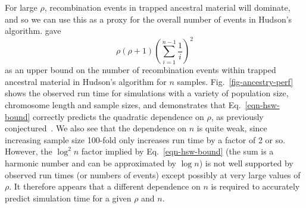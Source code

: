 \documentclass{article}
\begin{document}
For large $\rho$, recombination events in trapped ancestral material will
dominate, and so we can use this as a proxy for the overall number
of events in Hudson's algorithm.
\citet[Eq.~5.10]{hein2004gene} gave
\begin{equation}\label{eqn-hsw-bound}
\rho (\rho + 1) \left( \sum_{i=1}^{n-1} \frac{1}{i} \right)^2
\end{equation}
as an upper bound
on the number of recombination events within trapped ancestral material
in Hudson's algorithm for $n$ samples.
Fig.~\ref{fig-ancestry-perf} shows the observed run time for
simulations with a variety of population size, chromosome
length and sample sizes, and demonstrates that Eq.~\eqref{eqn-hsw-bound}
correctly predicts the quadratic dependence on $\rho$,
as previously conjectured~\citep[Fig.~2]{kelleher2016efficient}.
We also see that the dependence on $n$ is quite weak,
since increasing sample size 100-fold
only increases run time by a factor of 2 or so. However, the
$\log^2{n}$ factor implied by Eq.~\eqref{eqn-hsw-bound}
(the sum is a harmonic number and can be approximated by $\log{n}$)
is not well supported by observed run times (or numbers of events)
except possibly at very
large values of $\rho$. It therefore appears that a different dependence
on $n$ is required to accurately predict simulation time for a
given $\rho$ and $n$.
\end{document}

